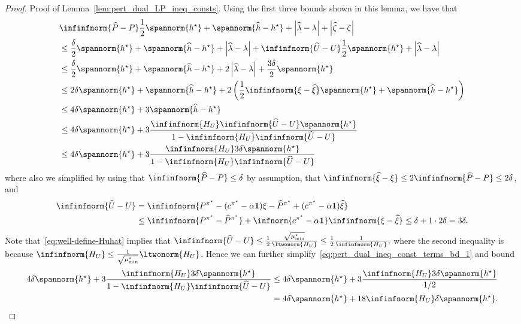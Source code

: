 \documentclass[mnsc,nonblindrev]{informs3}
\newcommand{\Phat}{\widehat{P}}
\newcommand{\one}{\mathbf{1}}
\newcommand{\pistar}{\pi^\star}
\newcommand{\hhat}{\widehat{h}}
\newcommand{\uhat}{\widehat{U}}
\newcommand{\xihat}{\widehat{\xi}}
\newcommand{\zetahat}{\widehat{\zeta}}
\newcommand{\lambdahat}{\widehat{\lambda}}
\begin{document}
\begin{APPENDICES}
\begin{proof}{Proof of Lemma~\ref{lem:pert_dual_LP_ineq_consts}.}
Using the first three bounds shown in this lemma, we have that
\begin{align}
    &\infinfnorm{\Phat - P } \frac{1}{2}\spannorm{h^\star} + \spannorm{\hhat - h^\star} + \left|\lambdahat - \lambda \right|  + \left|\zetahat-\zeta\right| \nonumber\\
    & \leq \frac{\delta }{2}\spannorm{h^\star} + \spannorm{\hhat - h^\star} + \left|\lambdahat - \lambda \right|+ \infinfnorm{\uhat - U} \frac{1}{2}\spannorm{h^\star} + \left|\lambdahat - \lambda \right| \nonumber\\
    & \leq \frac{\delta }{2}\spannorm{h^\star} + \spannorm{\hhat - h^\star} + 2\left|\lambdahat - \lambda \right|+ \frac{3\delta }{2}\spannorm{h^\star}\nonumber\\
    & \leq 2 \delta \spannorm{h^\star} + \spannorm{\hhat - h^\star} + 2\left(  \frac{1}{2}\infinfnorm{\xi - \xihat} \spannorm{h^\star} + \spannorm{\hhat - h^\star}\right) \nonumber\\
    & \leq 4 \delta \spannorm{h^\star} + 3\spannorm{\hhat - h^\star} \nonumber\\
    & \leq 4 \delta \spannorm{h^\star} + 3 \frac{\infinfnorm{H_U} \infinfnorm{\uhat - U} \spannorm{h^\star}}{1-\infinfnorm{H_U} \infinfnorm{\uhat-U}}\nonumber\\
    & \leq 4 \delta \spannorm{h^\star} + 3 \frac{\infinfnorm{H_U} 3\delta \spannorm{h^\star}}{1-\infinfnorm{H_U} \infinfnorm{\uhat - U}} \label{eq:pert_dual_ineq_const_terms_bd_1}
\end{align}
where also we simplified by using that $\infinfnorm{\Phat - P } \leq \delta$ by assumption, that $\infinfnorm{\xihat - \xi} \leq 2 \infinfnorm{\Phat - P} \leq 2 \delta$, and
\begin{align*}
    \infinfnorm{\uhat - U} &= \infinfnorm{ P^{\pistar} - (c^{\pistar} -\alpha \one)\xi- \Phat^{\pistar} + (c^{\pistar} -\alpha \one)\widehat \xi} \\
    & \leq \infinfnorm{P^{\pistar} - \Phat^{\pistar}} + \infnorm{c^{\pistar} -\alpha \one} \infinfnorm{\xi - \widehat \xi} 
    \leq \delta + 1\cdot 2 \delta 
    = 3\delta.
\end{align*}
Note that~\eqref{eq:well-define-Huhat} implies that
$
    \infinfnorm{\uhat - U} \leq \frac{1}{2}\frac{\sqrt{\mu_{\min}^\star}}{\ltwonorm{H_U}} \leq \frac{1}{2} \frac{1}{\infinfnorm{H_U}},
$
where the second inequality is because $\infinfnorm{H_U} \leq \frac{1}{\sqrt{\mu^\star_{\min}}}\ltwonorm{H_U}$. Hence we can further simplify~\eqref{eq:pert_dual_ineq_const_terms_bd_1} and bound
\begin{align*}
    4 \delta \spannorm{h^\star} + 3 \frac{\infinfnorm{H_U} 3\delta \spannorm{h^\star}}{1-\infinfnorm{H_U} \infinfnorm{\uhat - U}} &\leq 4 \delta \spannorm{h^\star} + 3 \frac{\infinfnorm{H_U} 3\delta \spannorm{h^\star}}{1/2} \\
    &= 4 \delta \spannorm{h^\star} + 18\infinfnorm{H_U} \delta \spannorm{h^\star}.
\end{align*}



\end{proof}
\end{APPENDICES}
\end{document}
